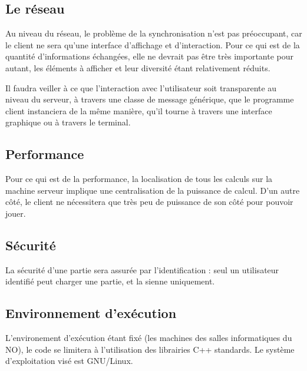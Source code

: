 \documentclass[a4paper,titlepage]{scrreprt}
\begin{document}
  \subsection{Le réseau}
  Au niveau du réseau, le problème de la synchronisation n'est pas préoccupant, 
  car le client ne sera qu'une interface d'affichage et d'interaction. 
  Pour ce qui est de la quantité d'informations échangées, 
  elle ne devrait pas être très importante pour autant, 
  les éléments à afficher et leur diversité étant relativement réduits.
  
  Il faudra veiller à ce que l'interaction avec l'utilisateur soit transparente 
  au niveau du serveur, à travers une classe de message générique, 
  que le programme client instanciera de la même manière, 
  qu'il tourne à travers une interface graphique ou à travers le terminal.
  \subsection{Performance}
  Pour ce qui est de la performance, la localisation de tous les calculs sur la machine serveur 
  implique une centralisation de la puissance de calcul. 
  D'un autre côté, le client ne nécessitera que très peu de puissance de son côté pour pouvoir jouer.
  \subsection{Sécurité}
  La sécurité d'une partie sera assurée par l'identification : 
  seul un utilisateur identifié peut charger une partie, et la sienne uniquement.
  \subsection{Environnement d'exécution}
  L'environement d'exécution étant fixé (les machines des salles informatiques du NO), 
  le code se limitera à l'utilisation des librairies C++ standards. 
  Le système d'exploitation visé est GNU/Linux.
\end{document}
